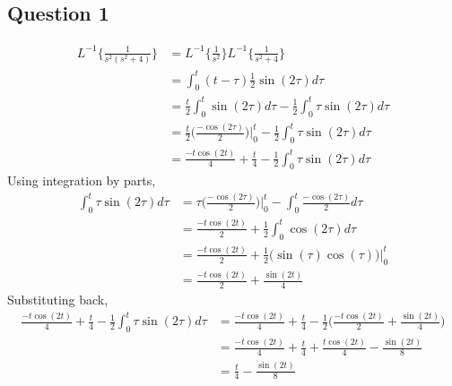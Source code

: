 \documentclass[titlepage]{article}
\begin{document}
\subsection*{Question 1}
\begin{align*}
    L^{-1}\{\frac{1}{s^2(s^2+4)}\} &= L^{-1}\{\frac{1}{s^2}\}L^{-1}\{\frac{1}{s^2+4}\} \\
    &= \int_0^t (t-\tau) \frac{1}{2} \sin(2\tau) d\tau \\
    &= \frac{t}{2} \int_0^t \sin(2\tau) d\tau - \frac{1}{2}\int_0^t \tau \sin(2\tau) d\tau \\
    &= \frac{t}{2}\bigg(\frac{-\cos(2\tau)}{2}\bigg)\bigg|_0^t - \frac{1}{2} \int_0^t \tau \sin(2\tau) d\tau \\
    &= \frac{-t\cos(2t)}{4} + \frac{t}{4} - \frac{1}{2} \int_0^t \tau \sin(2\tau) d\tau
\end{align*}
Using integration by parts,
\begin{align*}
    \int_0^t \tau \sin(2\tau) d\tau &= \tau \bigg(\frac{-\cos(2\tau)}{2}\bigg)\bigg|_0^t - \int_0^t \frac{-\cos(2\tau)}{2} d\tau \\
    &= \frac{-t\cos(2t)}{2} + \frac{1}{2} \int_0^t \cos(2\tau) d\tau \\
    &= \frac{-t\cos(2t)}{2} + \frac{1}{2} \bigg( \sin(\tau)\cos(\tau) \bigg) \bigg|_0^t\\
    &= \frac{-t\cos(2t)}{2} + \frac{\sin(2t)}{4}
\end{align*}
Substituting back,
\begin{align*}
    \frac{-t\cos(2t)}{4} + \frac{t}{4} - \frac{1}{2} \int_0^t \tau \sin(2\tau) d\tau &= \frac{-t\cos(2t)}{4} + \frac{t}{4} - \frac{1}{2} \bigg( \frac{-t\cos(2t)}{2} + \frac{\sin(2t)}{4} \bigg) \\
    &= \frac{-t\cos(2t)}{4} + \frac{t}{4} + \frac{t\cos(2t)}{4} - \frac{\sin(2t)}{8} \\
    &= \frac{t}{4} - \frac{\sin(2t)}{8}
\end{align*}
\end{document}
